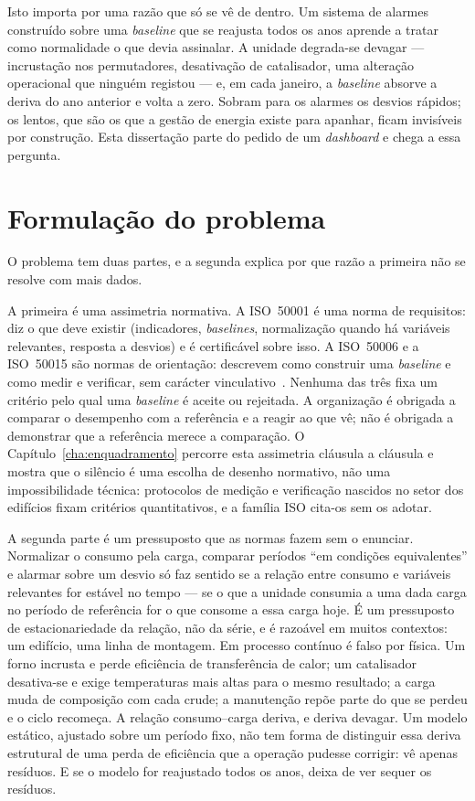 Isto importa por uma razão que só se vê de dentro. Um sistema de alarmes
construído sobre uma \emph{baseline} que se reajusta todos os anos
aprende a tratar como normalidade o que devia assinalar. A unidade
degrada-se devagar --- incrustação nos permutadores, desativação de
catalisador, uma alteração operacional que ninguém registou --- e, em
cada janeiro, a \emph{baseline} absorve a deriva do ano anterior e volta
a zero. Sobram para os alarmes os desvios rápidos; os lentos, que são
os que a gestão de energia existe para apanhar, ficam invisíveis por
construção. Esta dissertação parte do pedido de um \emph{dashboard} e
chega a essa pergunta.

\section{Formulação do problema}
\label{sec:problema}

O problema tem duas partes, e a segunda explica por que razão a
primeira não se resolve com mais dados.

A primeira é uma assimetria normativa. A ISO~50001 é uma norma de
requisitos: diz o que deve existir (indicadores, \emph{baselines},
normalização quando há variáveis relevantes, resposta a desvios) e é
certificável sobre isso. A ISO~50006 e a ISO~50015 são normas de
orientação: descrevem como construir uma \emph{baseline} e como medir e
verificar, sem carácter vinculativo~\cite{ISO50006_2014,ISO50015_2014}.
Nenhuma das três fixa um critério pelo qual uma \emph{baseline} é aceite
ou rejeitada. A organização é obrigada a comparar o desempenho com a
referência e a reagir ao que vê; não é obrigada a demonstrar que a
referência merece a comparação. O Capítulo~\ref{cha:enquadramento}
percorre esta assimetria cláusula a cláusula e mostra que o silêncio é
uma escolha de desenho normativo, não uma impossibilidade técnica:
protocolos de medição e verificação nascidos no setor dos edifícios
fixam critérios quantitativos, e a família ISO cita-os sem os adotar.

A segunda parte é um pressuposto que as normas fazem sem o enunciar.
Normalizar o consumo pela carga, comparar períodos \enquote{em condições
equivalentes} e alarmar sobre um desvio só faz sentido se a relação
entre consumo e variáveis relevantes for estável no tempo --- se o que
a unidade consumia a uma dada carga no período de referência for o que
consome a essa carga hoje. É um pressuposto de estacionariedade da
relação, não da série, e é razoável em muitos contextos: um edifício,
uma linha de montagem. Em processo contínuo é falso por física. Um
forno incrusta e perde eficiência de transferência de calor; um
catalisador desativa-se e exige temperaturas mais altas para o mesmo
resultado; a carga muda de composição com cada crude; a manutenção
repõe parte do que se perdeu e o ciclo recomeça. A relação
consumo--carga deriva, e deriva devagar. Um modelo estático, ajustado
sobre um período fixo, não tem forma de distinguir essa deriva
estrutural de uma perda de eficiência que a operação pudesse corrigir:
vê apenas resíduos. E se o modelo for reajustado todos os anos, deixa
de ver sequer os resíduos.

